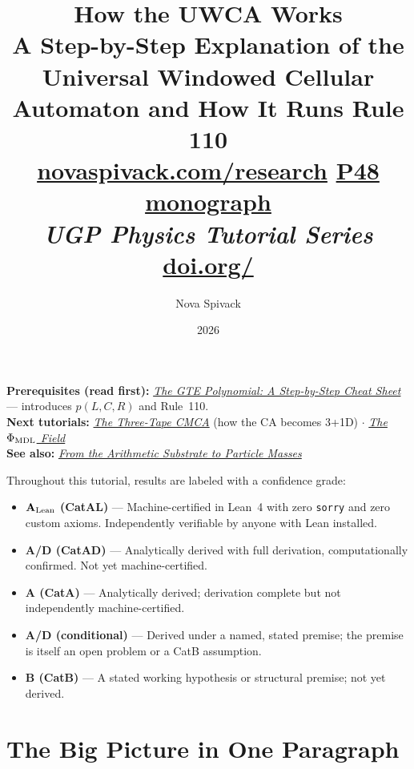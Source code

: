 \documentclass[11pt,a4paper]{article}
\title{\textbf{How the UWCA Works}\\[6pt]
\large A Step-by-Step Explanation of the Universal Windowed Cellular Automaton
and How It Runs Rule 110\\[8pt]
\normalsize
\href{https://novaspivack.com/research}{novaspivack.com/research}\quad
\href{https://doi.org/10.5281/zenodo.20560550}{P48 monograph}\\[4pt]\normalsize\textit{UGP Physics Tutorial Series}
\\[2pt]\small\href{https://doi.org/\TutorialDOI}{doi.org/\TutorialDOI}}
\author{Nova Spivack}
\date{2026}
\begin{document}
\setcounter{tocdepth}{2}
\maketitle
\tableofcontents
\newpage

\begin{tcolorbox}[colback=blue!6,colframe=blue!40!black,
  title=\textbf{UGP Physics Tutorial Series}]
\textbf{Prerequisites (read first):} \href{https://doi.org/10.5281/zenodo.20657889}{\emph{The GTE Polynomial: A Step-by-Step Cheat Sheet}} --- introduces $p(L,C,R)$ and Rule~110.\\[4pt]
\textbf{Next tutorials:} \href{https://doi.org/10.5281/zenodo.20657906}{\emph{The Three-Tape CMCA}} (how the CA becomes 3+1D) $\cdot$ \href{https://doi.org/10.5281/zenodo.20657885}{\emph{The $\Phi_{\rm MDL}$ Field}}\\[4pt]
\textbf{See also:} \href{https://doi.org/10.5281/zenodo.20657913}{\emph{From the Arithmetic Substrate to Particle Masses}}
\end{tcolorbox}

\begin{tcolorbox}[colback=boxgreen,colframe=green!50!black,
  title=\textbf{Claim-Strength Taxonomy}]
Throughout this tutorial, results are labeled with a confidence grade:
\begin{itemize}[itemsep=2pt]
  \item \textbf{$\mathbf{A}_{\rm Lean}$ (CatAL)} --- Machine-certified in Lean~4 with zero \texttt{sorry} and zero custom axioms.  Independently verifiable by anyone with Lean installed.
  \item \textbf{A/D (CatAD)} --- Analytically derived with full derivation, computationally confirmed.  Not yet machine-certified.
  \item \textbf{A (CatA)} --- Analytically derived; derivation complete but not independently machine-certified.
  \item \textbf{A/D (conditional)} --- Derived under a named, stated premise; the premise is itself an open problem or a CatB assumption.
  \item \textbf{B (CatB)} --- A stated working hypothesis or structural premise; not yet derived.
\end{itemize}
\end{tcolorbox}


\section{The Big Picture in One Paragraph}
\end{document}
